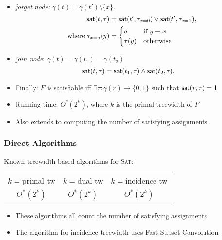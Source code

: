 \begin{frame}

  \begin{itemize}
  	\item \emph{forget node}: $\gamma(t) = \gamma(t') \setminus \{x\}$.\pause
  	\begin{align*}
  	\mathsf{sat}(t, \tau) &= \mathsf{sat}(t', \tau_{x=0})\vee \mathsf{sat}(t', \tau_{x=1}),\\
  	\text{where } \tau_{x=a}(y) &= \begin{cases} a & \text{if $y=x$}\\ \tau(y) & \text{otherwise}\end{cases}
  	\end{align*}
  	\pause
  	\item \emph{join node}: $\gamma(t) = \gamma(t_1) = \gamma(t_2)$\pause
  	  	\begin{align*}
  	  	\mathsf{sat}(t, \tau) &= \mathsf{sat}(t_1, \tau) \wedge \mathsf{sat}(t_2, \tau).
  	  	\end{align*}
  \end{itemize}
  
  \pause
  \begin{itemize}
   \item Finally: $F$ is satisfiable iff $\exists \tau: \gamma(r) \rightarrow \{0,1\}$ such that $\mathsf{sat}(r,\tau)=1$
   \item Running time: $O^*(2^k)$, where $k$ is the primal treewidth of $F$
   \item Also extends to computing the number of satisfying assignments
  \end{itemize}

\end{frame}


\begin{frame}
  \frametitle{Direct Algorithms}
  
  \noindent
  Known treewidth based algorithms for \textsc{Sat}:
  \begin{center}
  \begin{tabular}{c@{\qquad} c@{\qquad} c}
    $k= {}$primal tw & $k= {}$dual tw & $k= {}$incidence tw\\[4pt]
    $O^*(2^{k})$&
    $O^*(2^{k})$&
    $O^*(2^{k})$\\
  \end{tabular}
\end{center}
  \begin{itemize}
  \item These algorithms all count the number of satisfying assignments
  \item The algorithm for incidence treewidth \cite{SlivovskyS20} uses Fast Subset Convolution
  \end{itemize}
\end{frame}


